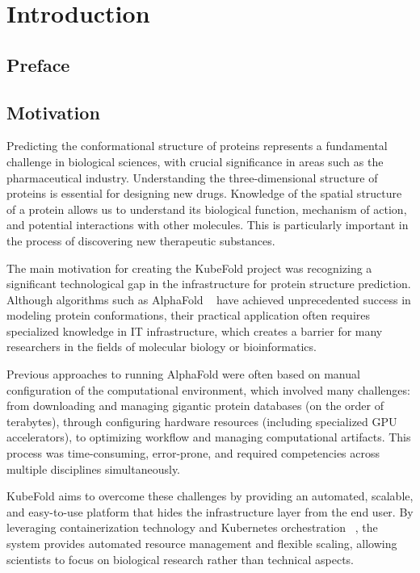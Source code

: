 \chapter{Introduction}


\section{Preface}


\section{Motivation}

Predicting the conformational structure of proteins represents a fundamental challenge in biological sciences, with crucial significance in areas such as the pharmaceutical industry.
Understanding the three-dimensional structure of proteins is essential for designing new drugs.
Knowledge of the spatial structure of a protein allows us to understand its biological function, mechanism of action, and potential interactions with other molecules.
This is particularly important in the process of discovering new therapeutic substances.

The main motivation for creating the KubeFold project was recognizing a significant technological gap in the infrastructure for protein structure prediction.
Although algorithms such as AlphaFold ~\cite{alphafold3} have achieved unprecedented success in modeling protein conformations, their practical application often requires specialized knowledge in IT infrastructure, which creates a barrier for many researchers in the fields of molecular biology or bioinformatics.

Previous approaches to running AlphaFold were often based on manual configuration of the computational environment, which involved many challenges: from downloading and managing gigantic protein databases (on the order of terabytes), through configuring hardware resources (including specialized GPU accelerators), to optimizing workflow and managing computational artifacts.
This process was time-consuming, error-prone, and required competencies across multiple disciplines simultaneously.

KubeFold aims to overcome these challenges by providing an automated, scalable, and easy-to-use platform that hides the infrastructure layer from the end user.
By leveraging containerization technology and Kubernetes orchestration ~\cite{kubernetes, container_orchestration}, the system provides automated resource management and flexible scaling, allowing scientists to focus on biological research rather than technical aspects.


